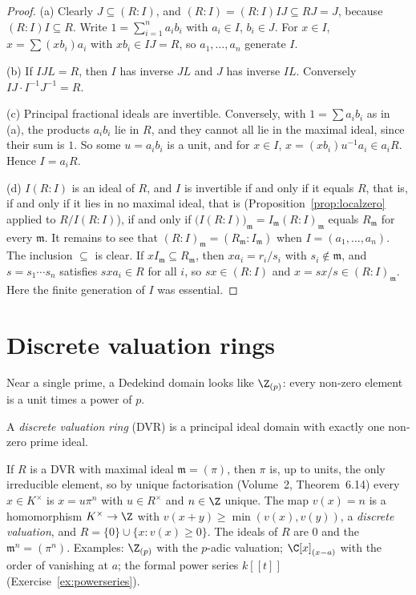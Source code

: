 \begin{proof}
(a) Clearly $J\subseteq(R:I)$, and $(R:I)=(R:I)IJ\subseteq RJ=J$, because $(R:I)I\subseteq R$. Write $1=\sum_{i=1}^na_ib_i$ with $a_i\in I$, $b_i\in J$. For $x\in I$, $x=\sum(xb_i)a_i$ with $xb_i\in IJ=R$, so
$a_1,\dots,a_n$ generate $I$.

(b) If $IJL=R$, then $I$ has inverse $JL$ and $J$ has inverse $IL$. Conversely $IJ\cdot I^{-1}J^{-1}=R$.

(c) Principal fractional ideals are invertible. Conversely, with $1=\sum a_ib_i$ as in (a), the products $a_ib_i$ lie in $R$, and they cannot all lie in the maximal ideal, since their sum is $1$. So some $u=a_ib_i$ is a unit,
and for $x\in I$, $x=(xb_i)u^{-1}a_i\in a_iR$. Hence $I=a_iR$.

(d) $I(R:I)$ is an ideal of $R$, and $I$ is invertible if and only if it equals $R$, that is, if and only if it lies in no maximal ideal, that is (Proposition~\ref{prop:localzero} applied to $R/I(R:I)$), if and only if
$\bigl(I(R:I)\bigr)_{\mathfrak m}=I_{\mathfrak m}(R:I)_{\mathfrak m}$ equals $R_{\mathfrak m}$ for every $\mathfrak m$. It remains to see that $(R:I)_{\mathfrak m}=(R_{\mathfrak m}:I_{\mathfrak m})$ when $I=(a_1,\dots,a_n)$.
The inclusion $\subseteq$ is clear. If $xI_{\mathfrak m}\subseteq R_{\mathfrak m}$, then $xa_i=r_i/s_i$ with $s_i\notin\mathfrak m$, and $s=s_1\cdots s_n$ satisfies $sxa_i\in R$ for all $i$, so $sx\in(R:I)$ and
$x=sx/s\in(R:I)_{\mathfrak m}$. Here the finite generation of $I$ was essential.
\end{proof}

\section{Discrete valuation rings}

Near a single prime, a Dedekind domain looks like $\Z_{(p)}$: every non-zero element is a unit times a power of $p$.

\begin{definition}\label{def:dvr}
A \emph{discrete valuation ring} (DVR) is a principal ideal domain with exactly one non-zero prime ideal.
\end{definition}

If $R$ is a DVR with maximal ideal $\mathfrak m=(\pi)$, then $\pi$ is, up to units, the only irreducible element, so by unique factorisation (Volume~2, Theorem~6.14) every $x\in K^\times$ is $x=u\pi^n$ with $u\in R^\times$ and
$n\in\Z$ unique. The map $v(x)=n$ is a homomorphism $K^\times\to\Z$ with $v(x+y)\ge\min(v(x),v(y))$, a \emph{discrete valuation}, and $R=\{0\}\cup\{x:v(x)\ge0\}$. The ideals of $R$ are $0$ and the $\mathfrak m^n=(\pi^n)$.
Examples: $\Z_{(p)}$ with the $p$-adic valuation; $\C[x]_{(x-a)}$ with the order of vanishing at $a$; the formal power series $k[[t]]$ (Exercise~\ref{ex:powerseries}).

